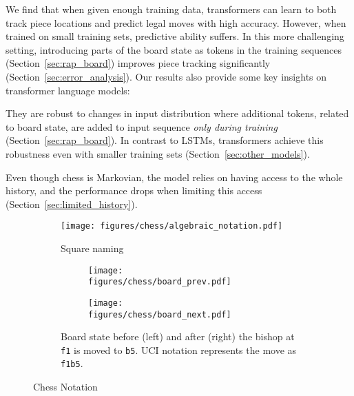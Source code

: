 \documentclass[12pt]{thesis-umich}[thesis]
\newcommand{\pos}[1]{\texttt{#1}}
\begin{document}
We find that when given enough training data, transformers can learn to both track piece locations and predict legal moves with high accuracy.
However, when trained on small training sets, predictive ability suffers. 
In this more challenging setting, introducing parts of the board state as tokens in the training sequences (Section~\ref{sec:rap_board})  improves piece tracking significantly (Section~\ref{sec:error_analysis}). 
Our results also provide some key insights on transformer language models:
\begin{enumerate*}[label=(\roman*)]
	\item They are robust to changes in input distribution where additional tokens, related to board state, are added to input sequence \emph{only during training} (Section~\ref{sec:rap_board}). 
	In contrast to LSTMs, transformers achieve this robustness even with smaller training sets (Section~\ref{sec:other_models}). 
	\item Even though chess is Markovian, the model relies on having access to the whole history, and the performance drops when limiting this access (Section~\ref{sec:limited_history}). 
\end{enumerate*}


\begin{figure*}
\begin{subfigure}{0.3\textwidth}
   \texttt{[image: figures/chess/algebraic\_notation.pdf]}
   \caption{Square naming} \label{fig:algebraic_notation}
\end{subfigure}
\hspace*{\fill}
\begin{subfigure}{0.63\textwidth}
\begin{subfigure}{0.43\textwidth}
   \vspace{.2in}\texttt{[image: figures/chess/board\_prev.pdf]}
\end{subfigure}
\hspace*{\fill}
\begin{subfigure}{0.43\textwidth}
   \vspace{.2in}\texttt{[image: figures/chess/board\_next.pdf]}
\end{subfigure}
\vspace{.1in}
\caption{Board state before (left) and after (right) the bishop at \pos{f1} is moved to \pos{b5}. UCI notation represents the move as \pos{f1b5}.}
\label{fig:move_notation}
\end{subfigure}
\vspace{-0.05in}
\caption{
Chess Notation }
\end{figure*}
 
\end{document}
